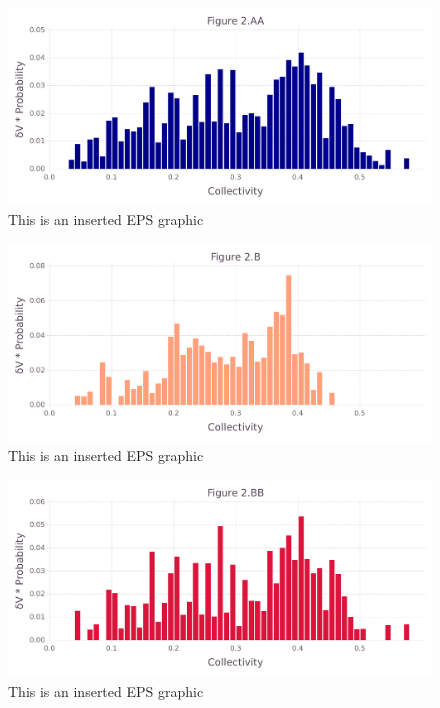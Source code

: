 \documentclass[10pt,letterpaper]{article}
\begin{document}
\begin{figure}[ht]
\begin{center}
\includegraphics[scale=0.5]{1hvr_apo/2aafigure.pdf}
\caption{This is an inserted EPS graphic}
\label{fig4}
\end{center}
\end{figure}

\begin{figure}[ht]
\begin{center}
\includegraphics[scale=0.5]{1hvr_apo/2bfigure.pdf}
\caption{This is an inserted EPS graphic}
\label{fig5}
\end{center}
\end{figure}

\begin{figure}[ht]
\begin{center}
\includegraphics[scale=0.5]{1hvr_apo/2bbfigure.pdf}
\caption{This is an inserted EPS graphic}
\label{fig6}
\end{center}
\end{figure}
\end{document}
